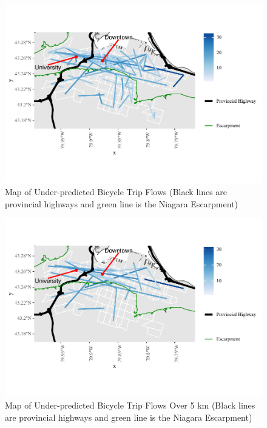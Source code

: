 \documentclass[smallextended]{svjour3}       %
\begin{document}
\begin{figure}
\centering
\includegraphics{BE-correlates-cycling-flows_files/figure-latex/residuals-under-1.pdf}
\caption{\label{fig:residuals-underestimated} Map of Under-predicted
Bicycle Trip Flows (Black lines are provincial highways and green line
is the Niagara Escarpment)}
\end{figure}

\begin{figure}
\centering
\includegraphics{BE-correlates-cycling-flows_files/figure-latex/residuals-over-5km-1.pdf}
\caption{\label{fig:residuals-over-5km} Map of Under-predicted Bicycle
Trip Flows Over 5 km (Black lines are provincial highways and green line
is the Niagara Escarpment)}
\end{figure}
\end{document}
